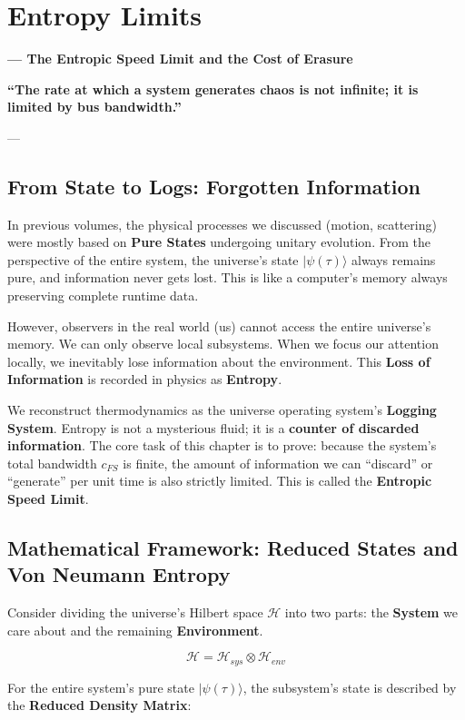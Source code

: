 \documentclass[11pt,a4paper,twoside]{book}
\begin{document}
\chapter{Entropy Limits}

\textbf{--- The Entropic Speed Limit and the Cost of Erasure}

\textbf{``The rate at which a system generates chaos is not infinite; it is limited by bus bandwidth.''}

---

\section{From State to Logs: Forgotten Information}

In previous volumes, the physical processes we discussed (motion, scattering) were mostly based on \textbf{Pure States} undergoing unitary evolution. From the perspective of the entire system, the universe's state \textbf{$|\psi(\tau)\rangle$} always remains pure, and information never gets lost. This is like a computer's memory always preserving complete runtime data.

However, observers in the real world (us) cannot access the entire universe's memory. We can only observe local subsystems. When we focus our attention locally, we inevitably lose information about the environment. This \textbf{Loss of Information} is recorded in physics as \textbf{Entropy}.

We reconstruct thermodynamics as the universe operating system's \textbf{Logging System}. Entropy is not a mysterious fluid; it is a \textbf{counter of discarded information}. The core task of this chapter is to prove: because the system's total bandwidth \textbf{$c_{FS}$} is finite, the amount of information we can ``discard'' or ``generate'' per unit time is also strictly limited. This is called the \textbf{Entropic Speed Limit}.

\section{Mathematical Framework: Reduced States and Von Neumann Entropy}

Consider dividing the universe's Hilbert space \textbf{$\mathcal{H}$} into two parts: the \textbf{System} we care about and the remaining \textbf{Environment}.

$$\mathcal{H} = \mathcal{H}_{sys} \otimes \mathcal{H}_{env}$$

For the entire system's pure state \textbf{$|\psi(\tau)\rangle$}, the subsystem's state is described by the \textbf{Reduced Density Matrix}:
\end{document}

